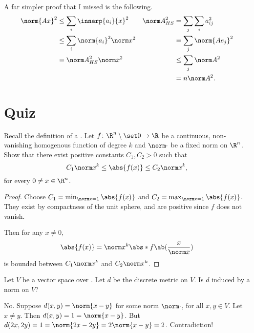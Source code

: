 \documentclass[12pt]{article}
\begin{document}
\begin{remark}
    A far simpler proof that I missed is the following.
    \begin{align*}
        \norm{Ax}^2
        &\le \sum_i \innerp{a_i}{x}^2
            &\hsn A^2 &= \sum_j \sum_i a_{ij}^2 \\
        &\le \sum_i \norm{a_i}^2 \norm x^2
            &&= \sum_j \norm{Ae_j}^2 \\
        &= \hsn A^2 \norm x^2
            &&\le \sum_j \norm A^2 \\
        &
            &&= n \norm A^2.
    \end{align*}
\end{remark}

\section*{Quiz} \label{sec:a1:quiz}
\begin{problem}
    Recall the definition of a .
    Let $f\colon \R^n \setminus \set 0 \to \R$ be a continuous,
    non-vanishing homogenous function of degree $k$
    and $\norm\cdot$ be a fixed norm on $\R^n$.
    Show that there exist positive constants $C_1, C_2 > 0$ such that \[
        C_1 \norm x^k \le \abs{f(x)} \le C_2 \norm x^k,
    \] for every $0 \ne x \in \R^n$.
\end{problem}
\begin{proof}
    Choose $C_1 = \min_{\norm x = 1} \abs{f(x)}$ and
    $C_2 = \max_{\norm x = 1} \abs{f(x)}$.
    They exist by compactness of the unit sphere, and are positive
    since $f$ does not vanish.

    Then for any $x \ne 0$, \[
        \abs{f(x)} = \norm x^k \abs*{f\ab({\frac{x}{\norm x}})}
    \] is bounded between $C_1 \norm x^k$ and $C_2 \norm x^k$.
\end{proof}

\begin{problem}
    Let $V$ be a vector space over \R.
    Let $d$ be the discrete metric on $V$.
    Is $d$ induced by a norm on $V$?
\end{problem}
\begin{solution}
    No.
    Suppose $d(x, y) = \norm{x - y}$ for some norm $\norm\cdot$,
    for all $x, y \in V$.
    Let $x \ne y$.
    Then $d(x, y) = 1 = \norm{x - y}$.
    But $d(2x, 2y) = 1 = \norm{2x - 2y} = 2 \norm{x - y} = 2$.
    Contradiction!
\end{solution}
\end{document}
